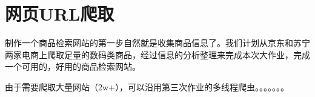 \section{网页URL爬取}

制作一个商品检索网站的第一步自然就是收集商品信息了。我们计划从京东和苏宁两家电商上爬取足量的数码类商品，经过信息的分析整理来完成本次大作业，完成一个可用的，好用的商品检索网站。

由于需要爬取大量网站（2w+），可以沿用第三次作业的多线程爬虫。。。。。。。


